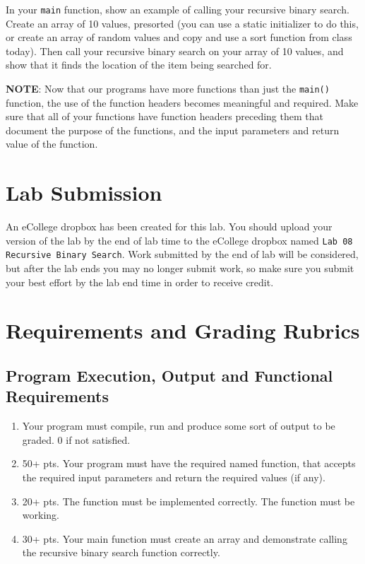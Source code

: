 \documentclass[11pt]{article}
\begin{document}
In your \verb~main~ function, show an example of calling your recursive
binary search.  Create an array of 10 values, presorted (you can use a
static initializer to do this, or create an array of random values and
copy and use a sort function from class today).  Then call your
recursive binary search on your array of 10 values, and show that it
finds the location of the item being searched for.

\textbf{NOTE}: Now that our programs have more functions than just the
\verb~main()~ function, the use of the function headers becomes meaningful
and required.  Make sure that all of your functions have function
headers preceding them that document the purpose of the functions, and
the input parameters and return value of the function.
\section*{Lab Submission}
\label{sec-4}


An eCollege dropbox has been created for this lab.  You should
upload your version of the lab by the end of lab time to the eCollege
dropbox named \verb~Lab 08 Recursive Binary Search~.  Work submitted by the end
of lab will be considered, but after the lab ends you may no longer
submit work, so make sure you submit your best effort by the lab end
time in order to receive credit.
\section*{Requirements and Grading Rubrics}
\label{sec-5}
\subsection*{Program Execution, Output and Functional Requirements}
\label{sec-5-1}


\begin{enumerate}
\item Your program must compile, run and produce some sort of output to be
  graded. 0 if not satisfied.
\item 50+ pts.  Your program must have the required named function,
   that accepts the required input parameters and return the required
   values (if any).
\item 20+ pts. The function must be implemented correctly.  The function
   must be working.
\item 30+ pts. Your main function must create an array and demonstrate
   calling the recursive binary search function correctly.
\end{enumerate}
\end{document}
